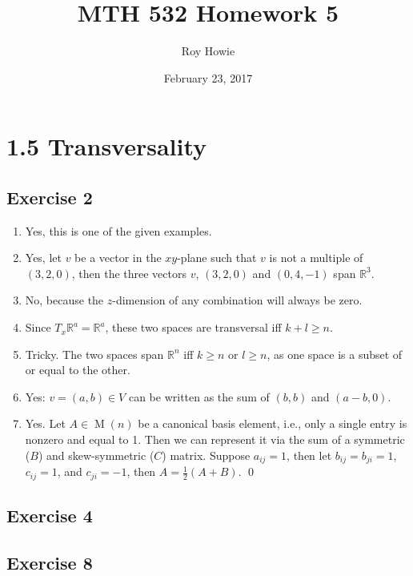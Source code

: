 \documentclass{article}
\newcommand{\R}{\mathbb{R}}
\DeclareMathOperator{\M}{M}
\begin{document}
\title{\vspace{-2cm}MTH 532 Homework 5}
\author{Roy Howie}
\date{February 23, 2017}
\maketitle

\section*{1.5 Transversality}
  \subsection*{Exercise 2}
    \begin{enumerate}[label=\textbf{(\alph*)}]
      \item{
        Yes, this is one of the given examples.
      }
      \item {
        Yes, let $v$ be a vector in the $xy$-plane such that $v$ is not a
        multiple of $(3,2,0)$, then the three vectors $v$, $(3,2,0)$ and $(0,4,
        -1)$ span $\R^3$.
      }
      \item {
        No, because the $z$-dimension of any combination will always be zero.
      }
      \item {
        Since $T_x\R^a=\R^a$, these two spaces are transversal iff $k+l\geq n$.
      }
      \item {
        Tricky. The two spaces span $\R^n$ iff $k\geq n$ or $l\geq n$, as one
        space is a subset of or equal to the other.
      }
      \item {
        Yes: $v=(a,b)\in V$ can be written as the sum of $(b,b)$ and $(a-b,0)$.
      }
      \item {
        Yes. Let $A\in\M(n)$ be a canonical basis element, i.e., only a single
        entry is nonzero and equal to 1. Then we can represent it via the sum
        of a symmetric ($B$) and skew-symmetric ($C$) matrix. Suppose $a_{ij}
        =1$, then let $b_{ij}=b_{ji}=1$, $c_{ij}=1$, and $c_{ji}=-1$, then
        $A=\frac{1}{2}(A+B)$.
      }
      \qed
    \end{enumerate}

  \subsection*{Exercise 4}

  \subsection*{Exercise 8}
\end{document}

